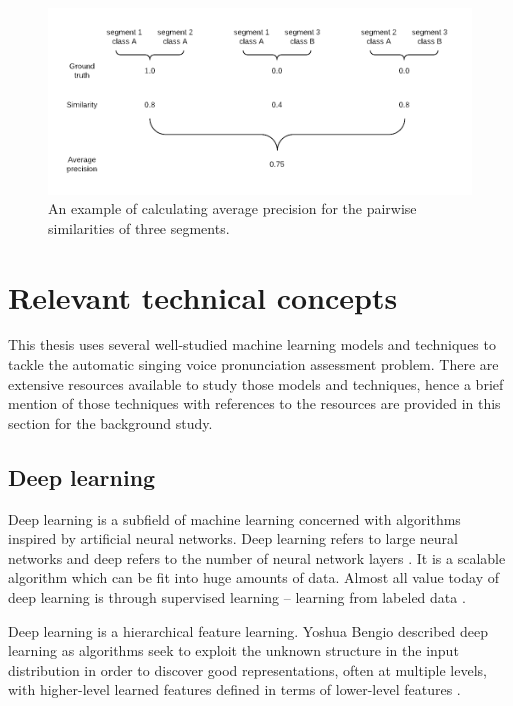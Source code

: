 \begin{figure}[ht!]
\includegraphics[width=\textwidth]{figs/blockDiags_rong/ch2_average_precision.png}
\caption{An example of calculating average precision for the pairwise similarities of three segments.}
\label{fig:ch2_average_precision}
\end{figure}

\section{Relevant technical concepts}

This thesis uses several well-studied machine learning models and techniques to tackle the automatic singing voice pronunciation assessment problem. There are extensive resources available to study those models and techniques, hence a brief mention of those techniques with references to the resources are provided in this section for the background study.

\subsection{Deep learning}

Deep learning is a subfield of machine learning concerned with algorithms inspired by artificial neural networks. Deep learning refers to large neural networks and deep refers to the number of neural network layers \cite{Dean}. It is a scalable algorithm which can be fit into huge amounts of data. Almost all value today of deep learning is through supervised learning -- learning from labeled data \cite{Ng}. 

Deep learning is a hierarchical feature learning. Yoshua Bengio described deep learning as algorithms seek to exploit the unknown structure in the input distribution in order to discover good representations, often at multiple levels, with higher-level learned features defined in terms of lower-level features \cite{Bengio2012a}.

